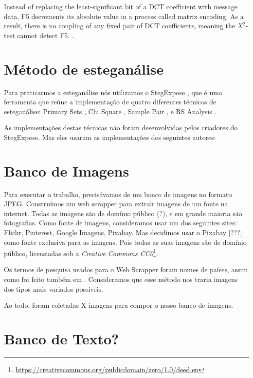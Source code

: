 \begin{citacao}[english]
Instead of replacing the least-significant bit of a DCT coefficient with message data, F5 decrements its absolute value in a process called matrix encoding. As a result, there is no coupling of any fixed pair of DCT coefficients, meaning the $X^{2}$-test cannot detect F5. \cite{provos_hide_2003}.
\end{citacao}


\section{Método de esteganálise}

Para praticarmos a esteganálise nós utilizamos o StegExpose \cite{boehm_stegexpose-tool_2014}, que é uma ferramenta que reúne a implementação de quatro diferentes técnicas de esteganálise: Primary Sets \cite{dumitrescu2002steganalysis}, Chi Square \cite{westfeld1999attacks}, Sample Pair \cite{dumitrescu2003detection}, e RS Analysis \cite{fridrich2001reliable}.

As implementações destas técnicas não foram desenvolvidas pelos criadores do StegExpose. Mas eles usaram as implementações dos seguintes autores:


\section{Banco de Imagens}

Para executar o trabalho, precisávamos de um banco de imagens no formato JPEG. Construímos um web scrapper para extrair imagens de um fonte na internet. Todas as imagens são de domínio público (?), e em grande maioria são fotografias. Como fonte de imagens, consideramos usar um dos seguintes sites: Flickr, Pinterest, Google Imagens, Pixabay. Mas decidimos usar o Pixabay [???] como fonte exclusiva para as imagens. Pois todas as suas imagens são de domínio público, licensiadas sob a \emph{Creative Commons CC0}\footnote{\url{https://creativecommons.org/publicdomain/zero/1.0/deed.en}}.

Os termos de pesquisa usados para o Web Scrapper foram nomes de países, assim como foi feito também em \cite{boehm_stegexpose-tool_2014}. Consideramos que esse método nos traria imagens dos tipos mais variados possíveis.

Ao todo, foram coletadas X imagens para compor o nosso banco de imagens.

\section{Banco de Texto?}

